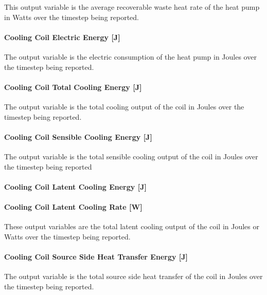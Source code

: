 This output variable is the average recoverable waste heat rate of the heat pump in Watts over the timestep being reported.

\paragraph{Cooling Coil Electric Energy {[}J{]}}\label{cooling-coil-electric-energy-j-4}

The output variable is the electric consumption of the heat pump in Joules over the timestep being reported.

\paragraph{Cooling Coil Total Cooling Energy {[}J{]}}\label{cooling-coil-total-cooling-energy-j-9}

The output variable is the total cooling output of the coil in Joules over the timestep being reported.

\paragraph{Cooling Coil Sensible Cooling Energy {[}J{]}}\label{cooling-coil-sensible-cooling-energy-j-9}

The output variable is the total sensible cooling output of the coil in Joules over the timestep being reported

\paragraph{Cooling Coil Latent Cooling Energy {[}J{]}}\label{cooling-coil-latent-cooling-energy-j-7}

\paragraph{Cooling Coil Latent Cooling Rate {[}W{]}}\label{cooling-coil-latent-cooling-rate-w-5}

These output variables are the total latent cooling output of the coil in Joules or Watts over the timestep being reported.

\paragraph{Cooling Coil Source Side Heat Transfer Energy {[}J{]}}\label{cooling-coil-source-side-heat-transfer-energy-j-4}

The output variable is the total source side heat transfer of the coil in Joules over the timestep being reported.

